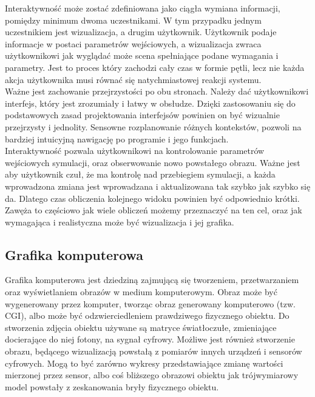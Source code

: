 \documentclass{article} %
\begin{document}
        Interaktywność może zostać zdefiniowana jako ciągła wymiana informacji, pomiędzy minimum dwoma uczestnikami.  W tym przypadku jednym uczestnikiem jest wizualizacja, a drugim użytkownik. Użytkownik podaje informacje w postaci parametrów wejściowych, a wizualizacja zwraca użytkownikowi jak wyglądać może scena spełniające podane wymagania i parametry. Jest to proces który zachodzi cały czas w formie pętli, lecz nie każda akcja użytkownika musi równać się natychmiastowej reakcji systemu.
        \\
        
        Ważne jest zachowanie przejrzystości po obu stronach. Należy dać użytkownikowi interfejs, który jest zrozumiały i łatwy w obsłudze. Dzięki zastosowaniu się do podstawowych zasad projektowania interfejsów powinien on być wizualnie przejrzysty i jednolity. Sensowne rozplanowanie różnych kontekstów, pozwoli na bardziej intuicyjną nawigację po programie i jego funkcjach.
        \\
    
        Interaktywność pozwala użytkownikowi na kontrolowanie parametrów wejściowych symulacji, oraz obserwowanie nowo powstałego obrazu. Ważne jest aby użytkownik czuł, że ma kontrolę nad przebiegiem symulacji, a każda wprowadzona zmiana jest wprowadzana i aktualizowana tak szybko jak szybko się da. Dlatego czas obliczenia kolejnego widoku powinien być odpowiednio krótki. Zawęża to częściowo jak wiele obliczeń możemy przeznaczyć na ten cel, oraz jak wymagająca i realistyczna może być wizualizacja i jej grafika. 
        \\
                
    \subsection{Grafika komputerowa}
        Grafika komputerowa jest dziedziną zajmującą się tworzeniem, przetwarzaniem oraz wyświetlaniem obrazów w medium komputerowym. Obraz może być wygenerowany przez komputer, tworząc obraz generowany komputerowo (tzw. CGI), albo może być odzwierciedleniem prawdziwego fizycznego obiektu. Do stworzenia zdjęcia obiektu używane są matryce światłoczułe, zmieniające docierające do niej fotony, na sygnał cyfrowy. Możliwe jest również stworzenie obrazu, będącego wizualizacją powstałą z pomiarów innych urządzeń i sensorów cyfrowych. Mogą to być zarówno wykresy przedstawiające zmianę wartości mierzonej przez sensor, albo coś bliższego obrazowi obiektu jak trójwymiarowy model powstały z zeskanowania bryły fizycznego obiektu.
        \\
        
\end{document}
